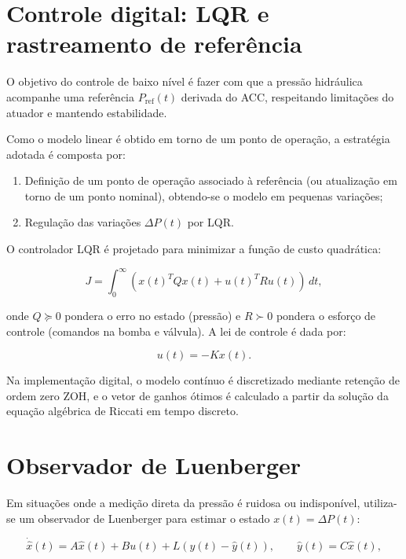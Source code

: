 \section{Controle digital: LQR e rastreamento de referência}
\label{sec:controle-lqr}

O objetivo do controle de baixo nível é fazer com que a pressão hidráulica acompanhe uma referência $P_{\text{ref}}(t)$ derivada do ACC, respeitando limitações do atuador e mantendo estabilidade.

Como o modelo linear é obtido em torno de um ponto de operação, a estratégia adotada é composta por:
\begin{enumerate}
\item Definição de um ponto de operação associado à referência (ou atualização em torno de um ponto nominal), obtendo-se o modelo em pequenas variações;
\item Regulação das variações $\Delta P(t)$ por LQR.
\end{enumerate}

O controlador LQR é projetado para minimizar a função de custo quadrática:

\begin{equation}
J = \int_{0}^{\infty}\left(x(t)^TQx(t) + u(t)^TRu(t)\right)\,dt,
\label{eq:lqr_cost}
\end{equation}

onde $Q \succeq 0$ pondera o erro no estado (pressão) e $R \succ 0$ pondera o esforço de controle (comandos na bomba e válvula). A lei de controle é dada por:

\begin{equation}
u(t) = -Kx(t).
\label{eq:lqr_law}
\end{equation}

Na implementação digital, o modelo contínuo é discretizado mediante retenção de ordem zero \gls{ZOH}, e o vetor de ganhos ótimos é calculado a partir da solução da equação algébrica de Riccati em tempo discreto.

\section{Observador de Luenberger}
\label{sec:controle-observador}

Em situações onde a medição direta da pressão é ruidosa ou indisponível, utiliza-se um observador de Luenberger para estimar o estado $x(t)=\Delta P(t)$:

\begin{equation}
\dot{\hat{x}}(t) = A\hat{x}(t) + Bu(t) + L\left(y(t) - \hat{y}(t)\right),
\qquad \hat{y}(t)=C\hat{x}(t),
\label{eq:luenberger}
\end{equation}

